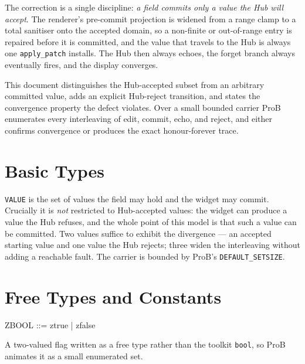 \documentclass[a4paper,10pt,fleqn]{article}
\begin{document}
The correction is a single discipline: \emph{a field commits only a value the Hub
will accept}.  The renderer's pre-commit projection is widened from a range clamp
to a total sanitiser onto the accepted domain, so a non-finite or out-of-range
entry is repaired before it is committed, and the value that travels to the Hub is
always one \texttt{apply\_patch} installs.  The Hub then always echoes, the forget
branch always eventually fires, and the display converges.

This document distinguishes the Hub-accepted subset from an arbitrary committed
value, adds an explicit Hub-reject transition, and states the convergence
property the defect violates.  Over a small bounded carrier ProB enumerates every
interleaving of edit, commit, echo, and reject, and either confirms convergence or
produces the exact honour-forever trace.

\section{Basic Types}

\begin{zed}
  [VALUE]
\end{zed}

\texttt{VALUE} is the set of values the field may hold and the widget may commit.
Crucially it is \emph{not} restricted to Hub-accepted values: the widget can
produce a value the Hub refuses, and the whole point of this model is that such a
value can be committed.  Two values suffice to exhibit the divergence --- an
accepted starting value and one value the Hub rejects; three widen the
interleaving without adding a reachable fault.  The carrier is bounded by ProB's
\texttt{DEFAULT\_SETSIZE}.

\section{Free Types and Constants}

\begin{zed}
  ZBOOL ::= ztrue | zfalse
\end{zed}

A two-valued flag written as a free type rather than the toolkit \texttt{bool}, so
ProB animates it as a small enumerated set.
\end{document}
